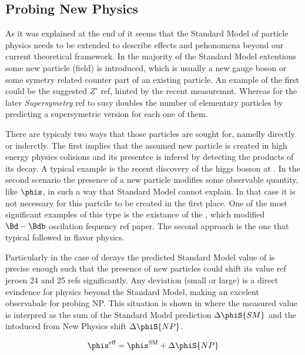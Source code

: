 \subsection{Probing New Physics}
\label{probe_new_phys}

As it was explained at the end of  it seems that the Standard Model of particle physics needs to be extended
to describe effects and pehonomena beyond our current theoretical framework. In the majority of the Standard Model
extentions some new particle (field) is introduced, which is usually a new gauge boson or some symetry related
counter part of an existing particle. An example of the first could be the suggested $Z'$ {\color{red} ref}, hinted by
the recent \lhcb measuremnt. Whereas for the later {\it {Supersymetry}} {\color{red} ref to susy} doubles the
number of elementary particles by predicting a supersymetric version for each one of them.

There are typicaly two ways that those particles are sought for, namelly directly or inderctly. The first implies that the
assumed new particle is created in high energy physics colisions and its presentce is infered by detecting the products of
its decay. A typical example is the recent discovery of the higgs bosson at .
In the second scenario the presence of a new particle modifies some observable quantity, like $\phis$, in such a way that Standard Model
cannot explain. In that case it is not necessary for this partcile to be created in the first place.
One of the most significant examples of this type is the existance of the \tquark, which modified $\Bd-\Bdb$
oscilation fequency{\color{red} ref paper}. The second approach is the one that typical followed in flavor physics.

Particularly in the case of \BsJpsiPhi decays the predicted Standard Model value of  is precise enough
such that the presence of new particles could shift its value {\color{red} ref jeroen 24 and 25 refs} significantly.
Any deviation (small or large) is a direct evindence for physics beyond the Standard Model, making \phis an excelent observabale for probing NP.
This situation is shown in  where the measured value  is interpred
as the sum of the Standard Model prediction $\Delta\phiS{SM}$ and the intoduced from New Physics shift $\Delta\phiS{NP}$.

\begin{equation}
 \phis^{\text {eff}} = \phis^{\tiny \text{SM}} + \Delta\phiS{NP}
 \label{phis_meas}
\end{equation}

